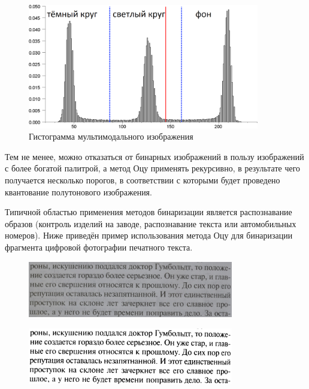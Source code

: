 \documentclass[12pt,a4paper]{extarticle} %
\begin{document}
\vfill
\begin{figure}[h]
 \centering
    \includegraphics[width=0.9\textwidth]{images/gist2.png}
	\caption{Гистограмма мультимодального изображения}
\end{figure}
\vfill
\newpage
Тем не менее, можно отказаться от бинарных изображений в пользу изображений с более богатой палитрой, а метод Оцу применять рекурсивно, в результате чего получается несколько порогов, в соответствии с которыми будет проведено квантование полутонового изображения.

Типичной областью применения методов бинаризации является распознавание образов (контроль изделий на заводе, распознавание текста или автомобильных номеров). Ниже приведён пример использования метода Оцу для бинаризации фрагмента цифровой фотографии печатного текста.

\begin{figure}[h]
 \centering
    \includegraphics[width=0.8\textwidth]{images/textorg.png}
\end{figure}

\begin{figure}[h]
 \centering
    \includegraphics[width=0.8\textwidth]{images/textbin.png}
\end{figure}
\end{document}
